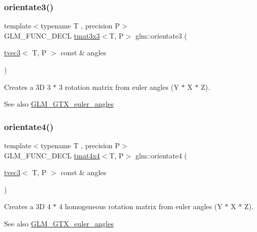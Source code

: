 \subsubsection{\texorpdfstring{orientate3()}{orientate3()}\hspace{0.1cm}{\footnotesize\ttfamily [2/2]}}
{\footnotesize\ttfamily template$<$typename T , precision P$>$ \\
G\+L\+M\+\_\+\+F\+U\+N\+C\+\_\+\+D\+E\+CL \hyperlink{structglm_1_1tmat3x3}{tmat3x3}$<$T, P$>$ glm\+::orientate3 (\begin{DoxyParamCaption}\item[{\hyperlink{structglm_1_1tvec3}{tvec3}$<$ T, P $>$ const \&}]{angles }\end{DoxyParamCaption})}

Creates a 3D 3 $\ast$ 3 rotation matrix from euler angles (Y $\ast$ X $\ast$ Z). \begin{DoxySeeAlso}{See also}
\hyperlink{group__gtx__euler__angles}{G\+L\+M\+\_\+\+G\+T\+X\+\_\+euler\+\_\+angles} 
\end{DoxySeeAlso}
\mbox{\label{group__gtx__euler__angles_ga4e25c9468b6f002c76e9a2412bcfa503}} 
\subsubsection{\texorpdfstring{orientate4()}{orientate4()}}
{\footnotesize\ttfamily template$<$typename T , precision P$>$ \\
G\+L\+M\+\_\+\+F\+U\+N\+C\+\_\+\+D\+E\+CL \hyperlink{structglm_1_1tmat4x4}{tmat4x4}$<$T, P$>$ glm\+::orientate4 (\begin{DoxyParamCaption}\item[{\hyperlink{structglm_1_1tvec3}{tvec3}$<$ T, P $>$ const \&}]{angles }\end{DoxyParamCaption})}

Creates a 3D 4 $\ast$ 4 homogeneous rotation matrix from euler angles (Y $\ast$ X $\ast$ Z). \begin{DoxySeeAlso}{See also}
\hyperlink{group__gtx__euler__angles}{G\+L\+M\+\_\+\+G\+T\+X\+\_\+euler\+\_\+angles} 
\end{DoxySeeAlso}
\mbox{\label{group__gtx__euler__angles_gaf9c8d0f1df88c5344165600774489bc5}} 
